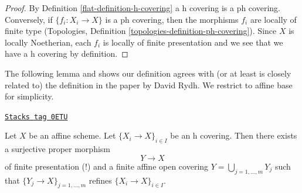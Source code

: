\begin{proof}

By Definition \ref{flat-definition-h-covering} a h covering is a ph covering.
Conversely, if $\{f_i : X_i \to X\}$ is a ph covering, then the morphisms
$f_i$ are locally of finite type (Topologies, Definition
\ref{topologies-definition-ph-covering}). Since $X$ is locally Noetherian,
each $f_i$ is locally of finite presentation and we see that we have
a h covering by definition.
\end{proof}

The following lemma and \cite[Theorem 8.4]{rydh_descent}
shows our definition agrees with (or at least is
closely related to) the definition in the paper \cite{rydh_descent}
by David Rydh. We restrict to affine base for simplicity.

\begin{lemma}
\label{flat-lemma-approximate-h-cover}
\href{https://stacks.math.columbia.edu/tag/0ETU}{\texttt{Stacks tag 0ETU}}

Let $X$ be an affine scheme. Let $\{X_i \to X\}_{i \in I}$
be an h covering. Then there exists a surjective proper morphism
$$
Y \longrightarrow X
$$
of finite presentation (!) and a finite affine open covering
$Y = \bigcup_{j = 1, \ldots, m} Y_j$ such that
$\{Y_j \to X\}_{j = 1, \ldots, m}$ refines $\{X_i \to X\}_{i \in I}$.
\end{lemma}

